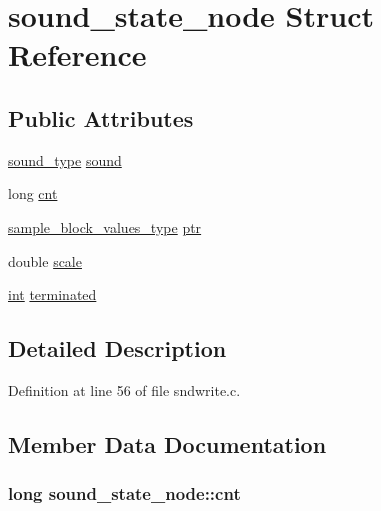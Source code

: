 \hypertarget{structsound__state__node}{}\section{sound\+\_\+state\+\_\+node Struct Reference}
\label{structsound__state__node}
\subsection*{Public Attributes}
\begin{DoxyCompactItemize}
\item 
\hyperlink{sound_8h_a792cec4ed9d6d636d342d9365ba265ea}{sound\+\_\+type} \hyperlink{structsound__state__node_a54b246ec115000276810d3646b9063e3}{sound}
\item 
long \hyperlink{structsound__state__node_aca19b1538ff75b29beed4dc171dac1cd}{cnt}
\item 
\hyperlink{sound_8h_a83d17f7b465d1591f27cd28fc5eb8a03}{sample\+\_\+block\+\_\+values\+\_\+type} \hyperlink{structsound__state__node_a985df8a24502d32ae7ca457a4967b0ec}{ptr}
\item 
double \hyperlink{structsound__state__node_a4db26c84fd8b8ec619f6128596763d1e}{scale}
\item 
\hyperlink{xmltok_8h_a5a0d4a5641ce434f1d23533f2b2e6653}{int} \hyperlink{structsound__state__node_a54e0ea7b81a157d790858a267be897d3}{terminated}
\end{DoxyCompactItemize}


\subsection{Detailed Description}


Definition at line 56 of file sndwrite.\+c.



\subsection{Member Data Documentation}
\subsubsection[{\texorpdfstring{cnt}{cnt}}]{\setlength{\rightskip}{0pt plus 5cm}long sound\+\_\+state\+\_\+node\+::cnt}\hypertarget{structsound__state__node_aca19b1538ff75b29beed4dc171dac1cd}{}\label{structsound__state__node_aca19b1538ff75b29beed4dc171dac1cd}


